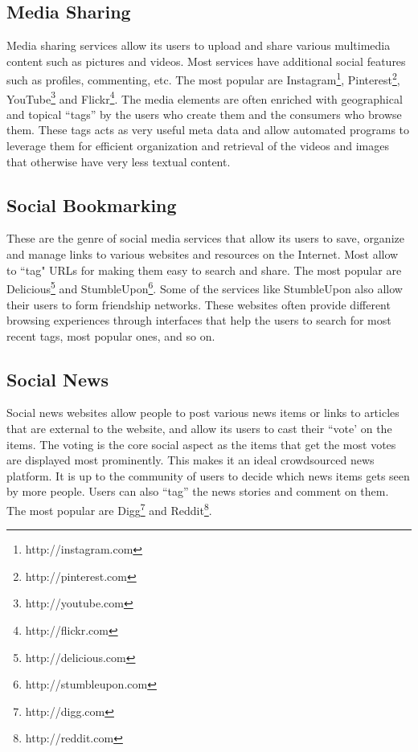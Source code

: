 \subsection{Media Sharing}
Media sharing services allow its users to upload and share various multimedia content such as pictures and videos. Most services have additional social features such as profiles, commenting, etc. The most popular are Instagram\footnote{http://instagram.com}, Pinterest\footnote{http://pinterest.com}, YouTube\footnote{http://youtube.com} and Flickr\footnote{http://flickr.com}. The media elements are often enriched with geographical and topical ``tags'' by the users who create them and the consumers who browse them. These tags acts as very useful meta data and allow automated programs to leverage them for efficient organization and retrieval of the videos and images that otherwise have very less textual content. 

\subsection{Social Bookmarking}
These are the genre of social media services that allow its users to save, organize and manage links to various websites and resources on the Internet. Most allow to ``tag" URLs for making them easy to search and share. The most popular are Delicious\footnote{http://delicious.com} and StumbleUpon\footnote{http://stumbleupon.com}. Some of the services like StumbleUpon also allow their users to form friendship networks. These websites often provide different browsing experiences through interfaces that help the users to search for most recent tags, most popular ones, and so on.

\subsection{Social News}
Social news websites allow people to post various news items or links to articles that are external to the website, and allow its users to cast their ``vote' on the items. The voting is the core social aspect as the items that get the most votes are displayed most prominently. This makes it an ideal crowdsourced news platform. It is up to the community of users to decide which news items gets seen by more people. Users can also ``tag'' the news stories and comment on them. The most popular are Digg\footnote{http://digg.com} and Reddit\footnote{http://reddit.com}.

